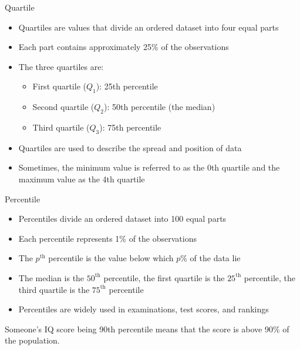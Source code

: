 \documentclass[12pt, aspectratio=169]{beamer}
\begin{document}
    \begin{frame}{Quartile}
        \begin{itemize}
            \item Quartiles are values that divide an ordered dataset into four equal parts
            \item Each part contains approximately 25\% of the observations
            \item The three quartiles are:
            \begin{itemize}
                \item First quartile ($Q_1$): 25th percentile
                \item Second quartile ($Q_2$): 50th percentile (the median)
                \item Third quartile ($Q_3$): 75th percentile
            \end{itemize}
            \item Quartiles are used to describe the spread and position of data
            \item Sometimes, the minimum value is referred to as the 0th quartile and the maximum value as the 4th quartile
        \end{itemize}
    \end{frame}


    \begin{frame}{Percentile}
        \begin{itemize}
            \item Percentiles divide an ordered dataset into 100 equal parts
            \item Each percentile represents 1\% of the observations
            \item The $p^{\text{th}}$ percentile is the value below which $p\%$ of the data lie
            \item The median is the $50^{\text{th}}$ percentile, the first quartile is the $25^{\text{th}}$ percentile, the third quartile is the $75^{\text{th}}$ percentile
            \item Percentiles are widely used in examinations, test scores, and rankings
        \end{itemize}
        Someone's IQ score being 90th percentile means that the score is above 90\% of the population.
    \end{frame}
\end{document}
